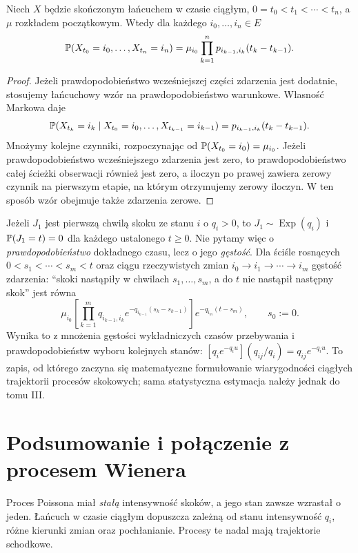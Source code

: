 \begin{stwierdzenie}
Niech $X$ będzie skończonym łańcuchem w czasie ciągłym,
$0=t_0<t_1<\cdots<t_n$, a $\mu$ rozkładem początkowym.
Wtedy dla każdego $i_0,\ldots,i_n\in E$
\[
\mathbb{P}(X_{t_0}=i_0,\ldots,X_{t_n}=i_n)
=\mu_{i_0}\prod_{k=1}^n
 p_{i_{k-1},i_k}(t_k-t_{k-1}).
\]
\end{stwierdzenie}
\begin{proof}
Jeżeli prawdopodobieństwo wcześniejszej części zdarzenia
jest dodatnie, stosujemy łańcuchowy wzór na prawdopodobieństwo
warunkowe. Własność Markowa daje
\[
\mathbb{P}(X_{t_k}=i_k\mid X_{t_0}=i_0,\ldots,X_{t_{k-1}}=i_{k-1})
=p_{i_{k-1},i_k}(t_k-t_{k-1}).
\]
Mnożymy kolejne czynniki, rozpoczynając od
$\mathbb{P}(X_{t_0}=i_0)=\mu_{i_0}$.
Jeżeli prawdopodobieństwo wcześniejszego zdarzenia jest zero,
to prawdopodobieństwo całej ścieżki obserwacji również
jest zero, a iloczyn po prawej zawiera zerowy czynnik
na pierwszym etapie, na którym otrzymujemy zerowy iloczyn.
W ten sposób wzór obejmuje także zdarzenia zerowe.
\end{proof}

\begin{uwaga}
Jeżeli $J_1$ jest pierwszą chwilą skoku ze stanu $i$ o
$q_i>0$, to $J_1\sim\operatorname{Exp}(q_i)$ i
$\mathbb{P}(J_1=t)=0$ dla każdego ustalonego $t\ge0$.
Nie pytamy więc o \emph{prawdopodobieństwo} dokładnego czasu,
lecz o jego \emph{gęstość}. Dla ściśle rosnących
$0<s_1<\cdots<s_m<t$ oraz ciągu rzeczywistych zmian
$i_0\to i_1\to\cdots\to i_m$ gęstość zdarzenia:
``skoki nastąpiły w chwilach $s_1,\ldots,s_m$,
a do $t$ nie nastąpił następny skok'' jest równa
\[
\mu_{i_0}\left[\prod_{k=1}^m
q_{i_{k-1},i_k}e^{-q_{i_{k-1}}(s_k-s_{k-1})}\right]
e^{-q_{i_m}(t-s_m)},\qquad s_0:=0.
\]
Wynika to z mnożenia gęstości wykładniczych czasów
przebywania i prawdopodobieństw wyboru kolejnych stanów:
$[q_i e^{-q_i u}](q_{ij}/q_i)=q_{ij}e^{-q_i u}$.
To zapis, od którego zaczyna się matematyczne formułowanie
wiarygodności ciągłych trajektorii procesów skokowych;
sama statystyczna estymacja należy jednak do tomu III.
\end{uwaga}

\section{Podsumowanie i połączenie z procesem Wienera}
Proces Poissona miał \emph{stałą} intensywność skoków,
a jego stan zawsze wzrastał o jeden. Łańcuch w czasie
ciągłym dopuszcza zależną od stanu intensywność $q_i$,
różne kierunki zmian oraz pochłanianie. Procesy te nadal
mają trajektorie schodkowe.

